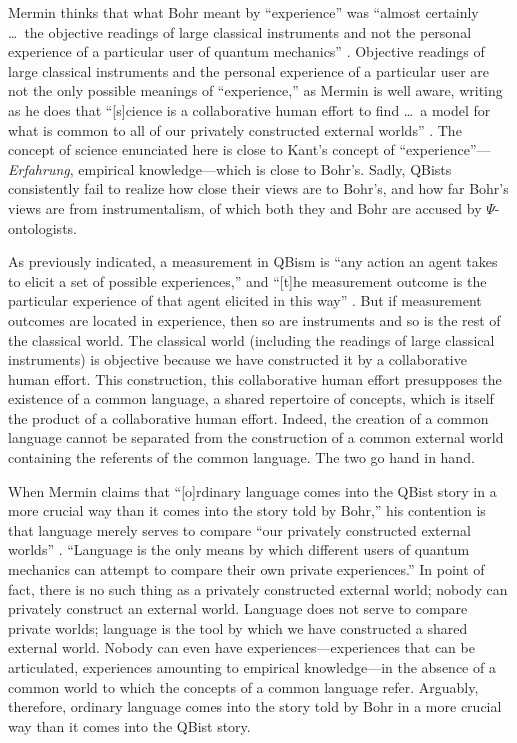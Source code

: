 \documentclass[12pt]{article}
\begin{document}
Mermin thinks that what Bohr meant by ``experience'' was ``almost certainly \dots\ the objective readings of large classical instruments and not the personal experience of a particular user of quantum mechanics'' \cite{MerminQBnotCop}. Objective readings of large classical instruments and the personal experience of a particular user are not the only possible meanings of ``experience,'' as Mermin is well aware, writing as he does that  ``[s]cience is a collaborative human effort to find \dots\ a model for what is common to all of our privately constructed external worlds'' \cite{MerminQBnotCop}. The concept of science enunciated here is close to Kant's concept of ``experience''---\emph{Erfahrung}, empirical knowledge---which is close to Bohr's. Sadly, QBists consistently fail to realize how close their views are to Bohr's, and how far Bohr's views are from instrumentalism, of which both they and Bohr are accused by $\Psi$-ontologists.

As previously indicated, a measurement in QBism is ``any action an agent takes to elicit a set of possible experiences,'' and ``[t]he measurement outcome is the particular experience of that agent elicited in this way'' \cite{FMS2014}. But if measurement outcomes are located in experience, then so are instruments and so is the rest of the classical world. The classical world (including the readings of large classical instruments) is objective because we have constructed it by a collaborative human effort. This construction, this collaborative human effort presupposes the existence of a common language, a shared repertoire of concepts, which is itself the product of a collaborative human effort. Indeed, the creation of a common language cannot be separated from the construction of a {common} external world containing the referents of the common language. The two go hand in hand.

When Mermin claims that ``[o]rdinary language comes into the QBist story in a more crucial way than it comes into the story told by Bohr,'' his contention is that language merely serves to compare ``our privately constructed external worlds'' \cite{MerminQBnotCop}. ``Language is the only means by which different users of quantum mechanics can attempt to compare their own private experiences.''  In point of fact, there is no such thing as a privately constructed external world; nobody can privately construct an external world. Language does not serve to compare private worlds; language is the tool by which we have constructed a shared external world. Nobody can even have experiences---experiences that can be articulated, experiences amounting to empirical knowledge---in the absence of a common world to which the concepts of a common language refer. Arguably, therefore, ordinary language comes into the story told by Bohr in a more crucial way than it comes into the QBist story.
\end{document}
